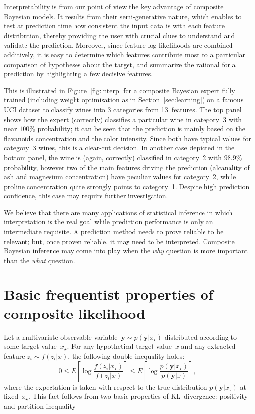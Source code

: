 \documentclass[english]{scrartcl}
\def\y{{\mathbf{y}}}
\begin{document}
Interpretability is from our point of view the key advantage of composite Bayesian models. It results from their semi-generative nature, which enables to test at prediction time how consistent the input data is with each feature distribution, thereby providing the user with crucial clues to understand and validate the prediction. Moreover, since feature log-likelihoods are combined additively, it is easy to determine which features contribute most to a particular comparison of hypotheses about the target, and summarize the rational for a prediction by highlighting a few decisive features. 

This is illustrated in Figure~\ref{fig:interp} for a composite Bayesian expert fully trained (including weight optimization as in Section~\ref{sec:learning}) on a famous UCI dataset \cite{Aeberhard-92} to classify wines into 3 categories from 13~features. The top panel shows how the expert (correctly) classifies a particular wine in category~3 with near $100\%$ probability; it can be seen that the prediction is mainly based on the flavanoids concentration and the color intensity. Since both have typical values for category~3 wines, this is a clear-cut decision. In another case depicted in the bottom panel, the wine is (again, correctly) classified in category~2 with $98.9\%$ probability, however two of the main features driving the prediction (alcanality of ash and magnesium concentration) have peculiar values for category~2, while proline concentration quite strongly points to category~1. Despite high prediction confidence, this case may require further investigation.

We believe that there are many applications of statistical inference in which interpretation is the real goal while prediction performance is only an intermediate requisite. A prediction method needs to prove reliable to be relevant; but, once proven reliable, it may need to be interpreted. Composite Bayesian inference may come into play when the {\em why} question is more important than the {\em what} question.


\appendix


\section{Basic frequentist properties of composite likelihood}
\label{app:frequentist}

Let a multivariate observable variable~$\y \sim p(\y|x_\star)$ distributed according to some target value~$x_\star$. For any hypothetical target value~$x$ and any extracted feature $z_i\sim f(z_i|x)$, the following double inequality holds:
$$
0 \leq
E\left[
\log \frac{f(z_i|x_\star)}{f(z_i|x)}
\right]
\leq
E\left[
\log \frac{p(\y|x_\star)}{p(\y|x)}
\right],
$$
where the expectation is taken with respect to the true distribution $p(\y|x_\star)$ at fixed~$x_\star$. This fact follows from two basic properties of KL~divergence: positivity and partition inequality.
\end{document}
